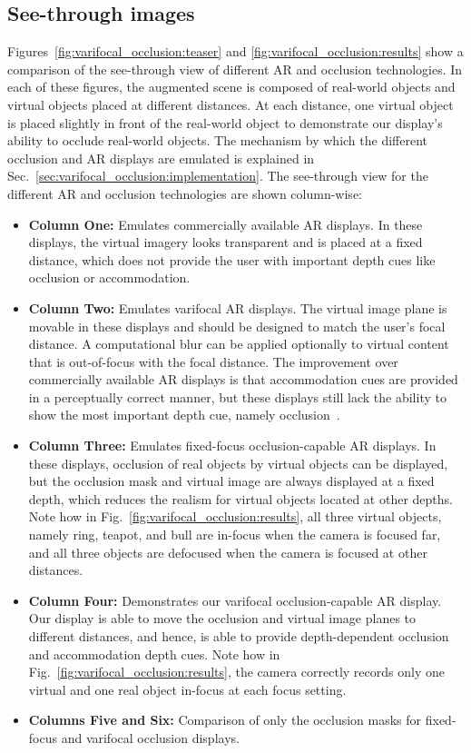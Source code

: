 
\subsection{See-through images}
\label{sec:results_images}
Figures~\ref{fig:varifocal_occlusion:teaser} and \ref{fig:varifocal_occlusion:results} show a comparison of the see-through view of different AR and occlusion technologies. In each of these figures, the augmented scene is composed of real-world objects and virtual objects placed at different distances. At each distance, one virtual object is placed slightly in front of the real-world object to demonstrate our display's ability to occlude real-world objects. The mechanism by which the different occlusion and AR displays are emulated is explained in Sec.~\ref{sec:varifocal_occlusion:implementation}. The see-through view for the different AR and occlusion technologies are shown column-wise:
\begin{itemize}
    \item \textbf{Column One:} Emulates commercially available AR displays. In these displays, the virtual imagery looks transparent and is placed at a fixed distance, which does not provide the user with important depth cues like occlusion or accommodation. 
    \item \textbf{Column Two:} Emulates varifocal AR displays. The virtual image plane is movable in these displays and should be designed to match the user's focal distance. A computational blur can be applied optionally to virtual content that is out-of-focus with the focal distance. The improvement over commercially available AR displays is that accommodation cues are provided in a perceptually correct manner, but these displays still lack the ability to show the most important depth cue, namely occlusion~\cite{cutting1995perceiving}.
    \item \textbf{Column Three:} Emulates fixed-focus occlusion-capable AR displays. In these displays, occlusion of real objects by virtual objects can be displayed, but the occlusion mask and virtual image are always displayed at a fixed depth, which reduces the realism for virtual objects located at other depths. Note how in Fig.~\ref{fig:varifocal_occlusion:results}, all three virtual objects, namely ring, teapot, and bull are in-focus when the camera is focused far, and all three objects are defocused when the camera is focused at other distances.
    \item \textbf{Column Four:} Demonstrates our varifocal occlusion-capable AR display. Our display is able to move the occlusion and virtual image planes to different distances, and hence, is able to provide depth-dependent occlusion and accommodation depth cues. Note how in Fig.~\ref{fig:varifocal_occlusion:results}, the camera correctly records only one virtual and one real object in-focus at each focus setting.
    \item \textbf{Columns Five and Six:} Comparison of only the occlusion masks for fixed-focus and varifocal occlusion displays.
\end{itemize}

